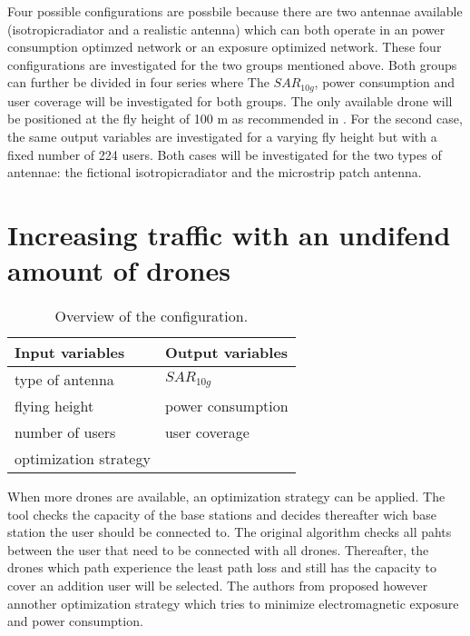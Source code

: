 Four possible configurations are possbile because there are two antennae available (\gls{isotropicradiator} and a realistic antenna) which can both operate in an power consumption optimzed network or an exposure optimized 
network. These four configurations are investigated for the two groups mentioned above.
Both groups can further be divided in four series where 
The $SAR_{10g}$, power consumption and user coverage will be investigated for both groups.
The only available drone will be positioned at the fly height of 100 m as recommended in \cite{J2}. For the second case, the same output variables are investigated 
for a varying fly height but with a fixed number of 224 users.
Both cases will be investigated for the two types of antennae: the fictional \gls{isotropicradiator} and the microstrip patch antenna.




\section{Increasing traffic with an undifend amount of drones}
\begin{table}[!htb]
      \centering
            \begin{tabular}{|l|l|}
            \hline
            \textbf{Input variables  }              & \textbf{Output variables}          \\   \hline 
            type of antenna                & $SAR_{10g}$               \\ 
            flying height                   & power consumption             \\ 
            number of users                & user coverage            \\ 
            optimization strategy           & \\
            \hline
            \end{tabular}
        \caption{Overview of the configuration.}
        \label{table:confOverviewScenario2}
\end{table}


When more drones are available, an optimization strategy can be applied. The tool checks the capacity of the base stations and decides thereafter
wich base station the user should be connected to. The original algorithm checks all pahts between the user that need to be connected with 
all drones. Thereafter, the drones which path experience the least path loss and still has the capacity to cover an addition user will be selected.
The authors from \cite{J1} proposed however annother optimization strategy which tries to minimize electromagnetic exposure and 
power consumption.


